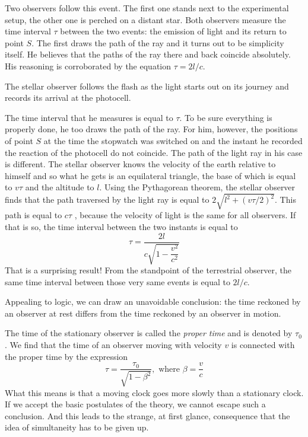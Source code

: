Two observers follow this event. The first one stands next to the experimental setup, the other one is perched on a distant star. Both observers measure the time interval $\tau$ between the two events: the emission of light and its return to point $S$. The first draws the path of the ray and it turns out to be simplicity itself. He believes that the paths of the ray there and back coincide absolutely. His reasoning is corroborated by the equation $\tau =2l/c$.

The stellar observer follows the flash as the light starts out on its journey and records its arrival at the photocell.

The time interval that he measures is equal to $\tau$. To be sure everything is properly done, he too draws the path of the ray. For him, however, the positions of point $S$ at the time the stopwatch was switched on and the instant he recorded the reaction of the photocell do not coincide. The path of the light ray in his case is different. The stellar observer knows the velocity of the earth relative to himself and so what he gets is an equilateral triangle, the base of which is equal to $v \tau$ and the altitude to $l$. Using the Pythagorean theorem, the stellar observer finds that the path traversed by the light ray is equal to $2 \sqrt{ l^{2}+ (v\tau/2)^{2}}$. This path is equal to $c \tau$ , because the ve­locity of light is the same for all observers. If that is so, the time interval between the two instants is equal to
\begin{equation*}%
\tau = \frac{2l}{c \sqrt{1 - \dfrac{v^{2}}{c^{2}}}}
\end{equation*}
That is a surprising result! From the standpoint of the terrestrial observer, the same time interval between those very same events is equal to $2l/c$.

Appealing to logic, we can draw an unavoidable con­clusion: the time reckoned by an observer at rest differs from the time reckoned by an observer in motion.

The time of the stationary observer is called the \emph{prop­er time} and is denoted by $\tau_{0}$. We find that the time of an observer moving with velocity $v$ is connected with the proper time by the expression
\begin{equation*}%
\tau = \frac{\tau_{0}}{\sqrt{1 - \beta^{2}}}, \,\,\textrm{where}\,\,\beta = \frac{v}{c}
\end{equation*}
What this means is that a moving clock goes more slowly than a stationary clock. If we accept the basic postulates of the theory, we cannot escape such a conclusion. And this leads to the strange, at first glance, consequence that the idea of simultaneity has to be given up.

